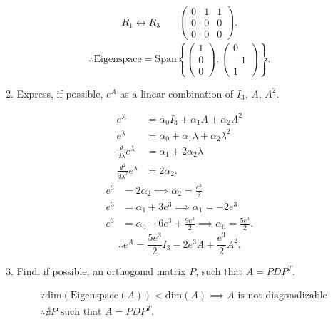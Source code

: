 \documentclass{zc-ust-hw}
\begin{document}
\begin{enumerate}
\begin{enumerate}
\begin{sol}
\begin{align}
            R_1 \leftrightarrow R_3
            \quad
            &\begin{pmatrix} 0 & 1 & 1 \\ 0 & 0 & 0 \\ 0 & 0 & 0 \end{pmatrix}
          .\end{align}
          \begin{equation}
            \therefore \text{Eigenspace}= \text{Span}\left\{ \begin{pmatrix} 1\\0\\0 \end{pmatrix}, \begin{pmatrix} 0\\-1\\1 \end{pmatrix}  \right\}
          .\end{equation}
        \end{sol}
      \item Express, if possible, \( e^{A}  \) as a linear combination of \(
        I_{3} \), \( A \), \( A^2 \). 
        \begin{sol}
          \begin{align}
            e^{A} &= \alpha_{0} I_{3} + \alpha_{1} A + \alpha_{2} A^2 \\ 
            e^{\lambda} &= \alpha_{0} + \alpha_{1} \lambda + \alpha_{2} \lambda^2 \\ 
            \frac{d}{d\lambda} e^{\lambda} &= \alpha_{1} + 2\alpha_{2} \lambda \\
            \frac{d^2}{d\lambda^2} e^{\lambda} &= 2\alpha_{2}
          .\end{align}
          \begin{align}
            e^3 &= 2\alpha_{2} \implies \alpha_{2} = \frac{e^3}{2} \\ 
            e^{3} &= \alpha_{1} + 3e^3 \implies \alpha_{1} = -2e^3 \\
            e^{3} &= \alpha_{0} -6e^3 + \frac{9e^3}{2} \implies \alpha_{0} = \frac{5e^3}{2}
          .\end{align}
          \begin{equation}
            \therefore e^{A} = \frac{5e^3}{2} I_{3} - 2e^3 A + \frac{e^3}{2} A^2
          .\end{equation}
        \end{sol}
      \item Find, if possible, an orthogonal matrix \( P \), such that \( A=PDP^{T}  \). 
        \begin{sol}
          \begin{align}
            &\because \text{dim}(\text{Eigenspace}(A)) < \text{dim}(A) \implies
            A \text{ is not diagonalizable} \\
            &\therefore \nexists P \text{ such that } A = PDP^T
          .\end{align}
        \end{sol}
    \end{enumerate}


\end{enumerate}
\end{document}
